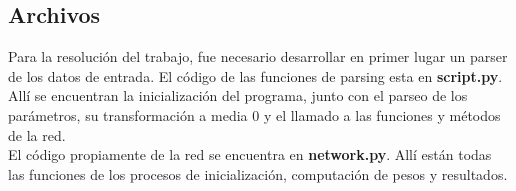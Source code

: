 









\subsection{Archivos}
Para la resolución del trabajo, fue necesario desarrollar en primer lugar un parser de los datos de entrada. El código de las funciones de parsing esta en \textbf{script.py}. Allí se encuentran la inicialización del programa, junto con el parseo de los parámetros, su transformación a media 0 y el llamado a las funciones y métodos de la red.\\

El código propiamente de la red se encuentra en \textbf{network.py}. Allí están todas las funciones de los procesos de inicialización, computación de pesos y resultados.\\



